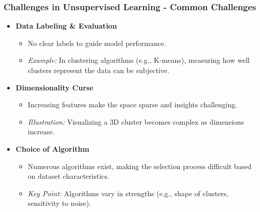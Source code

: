 \documentclass[aspectratio=169]{beamer}
\begin{document}
\begin{frame}[fragile]
    \frametitle{Challenges in Unsupervised Learning - Common Challenges}
    \begin{itemize}
        \item \textbf{Data Labeling \& Evaluation}
        \begin{itemize}
            \item No clear labels to guide model performance.
            \item \textit{Example:} In clustering algorithms (e.g., K-means), measuring how well clusters represent the data can be subjective.
        \end{itemize}
        
        \item \textbf{Dimensionality Curse}
        \begin{itemize}
            \item Increasing features make the space sparse and insights challenging.
            \item \textit{Illustration:} Visualizing a 3D cluster becomes complex as dimensions increase.
        \end{itemize}

        \item \textbf{Choice of Algorithm}
        \begin{itemize}
            \item Numerous algorithms exist, making the selection process difficult based on dataset characteristics.
            \item \textit{Key Point:} Algorithms vary in strengths (e.g., shape of clusters, sensitivity to noise).
        \end{itemize}
    \end{itemize}
\end{frame}
\end{document}

